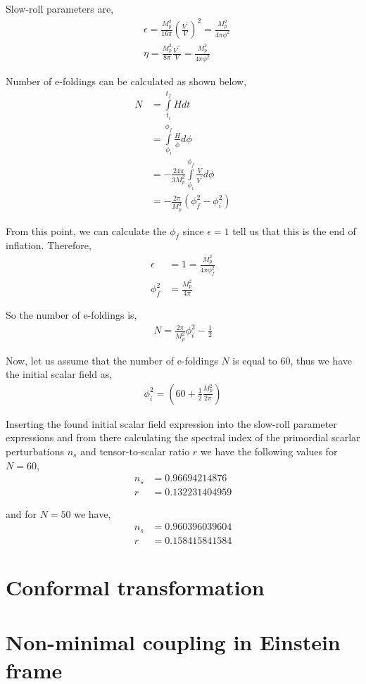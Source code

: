Slow-roll parameters are,
\begin{align}
&\epsilon = \frac{M_{p}^{2}}{16\pi}\left(\frac{V^{\prime}}{V}\right)^{2} = \frac{M_{p}^{2}}{4\pi \phi^{2}}\\
&\eta = \frac{M_{p}^{2}}{8\pi}\frac{V^{\prime\prime}}{V} = \frac{M_{p}^{2}}{4\pi\phi^{2}}
\end{align}

Number of e-foldings can be calculated as shown below,
\begin{align}
N &= \int\limits_{t_{i}}^{t_{f}}Hdt\\
&= \int\limits_{\phi_{i}}^{\phi_{f}}\frac{H}{\dot{\phi}}d\phi\\
&= -\frac{24\pi}{3M_{p}^{2}}\int\limits_{\phi_{i}}^{\phi_{f}}\frac{V}{V^{\prime}}d\phi\\
&= -\frac{2\pi}{M_{p}^{2}}\left(\phi_{f}^{2} - \phi_{i}^{2}\right)
\end{align}

From this point, we can calculate the $\phi_f$ since $\epsilon = 1$ tell us that this is the end of inflation. Therefore,
\begin{align}
\epsilon &= 1 = \frac{M_{p}^{2}}{4\pi\phi_{f}^{2}}\\
\phi_{f}^{2} &= \frac{M_{p}^{2}}{4\pi}
\end{align}

So the number of e-foldings is,
\begin{align}
N = \frac{2\pi}{M_{p}^{2}}\phi_{i}^{2} - \frac{1}{2}
\end{align}

Now, let us assume that the number of e-foldings $N$ is equal to $60$, thus we have the initial scalar field as,
\begin{align}
\phi_{i}^{2} = \left(60 + \frac{1}{2}\frac{M_{p}^{2}}{2\pi}\right)
\end{align}

Inserting the found initial scalar field expression into the slow-roll parameter expressions and from there calculating the spectral index of the primordial scarlar perturbations $n_{s}$ and tensor-to-scalar ratio $r$ we have the following values for $N=60$,
\begin{align}
n_{s} &= 0.96694214876\\
r &= 0.132231404959
\end{align}

and for $N=50$ we have,
\begin{align}
n_{s} &= 0.960396039604\\
r &= 0.158415841584
\end{align}


\section{Conformal transformation}


\section{Non-minimal coupling in Einstein frame}


